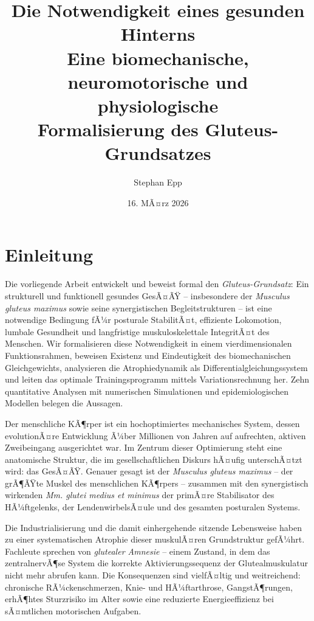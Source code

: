 ﻿\documentclass[12pt,a4paper]{report}
\title{\textbf{Die Notwendigkeit eines gesunden Hinterns}\\[0.4em]
	\large Eine biomechanische, neuromotorische und physiologische\\
	Formalisierung des Gluteus-Grundsatzes}
\author{Stephan Epp}
\date{16. MÃ¤rz 2026}
\theoremstyle{plain}
\theoremstyle{definition}
\theoremstyle{remark}
\begin{document}
	\maketitle
	
	\tableofcontents
	\newpage
	
	\chapter{Einleitung}
	Die vorliegende Arbeit entwickelt und beweist formal den \emph{Gluteus-Grundsatz}:
	Ein strukturell und funktionell gesundes GesÃ¤ÃŸ -- insbesondere der
	\emph{Musculus gluteus maximus} sowie seine synergistischen Begleitstrukturen --
	ist eine notwendige Bedingung fÃ¼r posturale StabilitÃ¤t, effiziente Lokomotion,
	lumbale Gesundheit und langfristige muskuloskelettale IntegritÃ¤t des Menschen.
	Wir formalisieren diese Notwendigkeit in einem vierdimensionalen Funktionsrahmen,
	beweisen Existenz und Eindeutigkeit des biomechanischen Gleichgewichts,
	analysieren die Atrophiedynamik als Differentialgleichungssystem und
	leiten das optimale Trainingsprogramm mittels Variationsrechnung her.
	Zehn quantitative Analysen mit numerischen Simulationen und
	epidemiologischen Modellen belegen die Aussagen.
	
	Der menschliche KÃ¶rper ist ein hochoptimiertes mechanisches System, dessen
	evolutionÃ¤re Entwicklung Ã¼ber Millionen von Jahren auf aufrechten, aktiven
	Zweibeingang ausgerichtet war. Im Zentrum dieser Optimierung steht eine
	anatomische Struktur, die im gesellschaftlichen Diskurs hÃ¤ufig unterschÃ¤tzt wird:
	das GesÃ¤ÃŸ. Genauer gesagt ist der \emph{Musculus gluteus maximus}
	-- der grÃ¶ÃŸte Muskel des menschlichen KÃ¶rpers -- zusammen mit den synergistisch
	wirkenden \emph{Mm. glutei medius et minimus} der primÃ¤re Stabilisator des
	HÃ¼ftgelenks, der LendenwirbelsÃ¤ule und des gesamten posturalen Systems.
	
	Die Industrialisierung und die damit einhergehende sitzende Lebensweise haben
	zu einer systematischen Atrophie dieser muskulÃ¤ren Grundstruktur gefÃ¼hrt.
	Fachleute sprechen von \emph{glutealer Amnesie} -- einem Zustand, in dem
	das zentralnervÃ¶se System die korrekte Aktivierungssequenz der Glutealmuskulatur
	nicht mehr abrufen kann. Die Konsequenzen sind vielfÃ¤ltig und weitreichend:
	chronische RÃ¼ckenschmerzen, Knie- und HÃ¼ftarthrose, GangstÃ¶rungen,
	erhÃ¶htes Sturzrisiko im Alter sowie eine reduzierte Energieeffizienz
	bei sÃ¤mtlichen motorischen Aufgaben.
	
\end{document}
